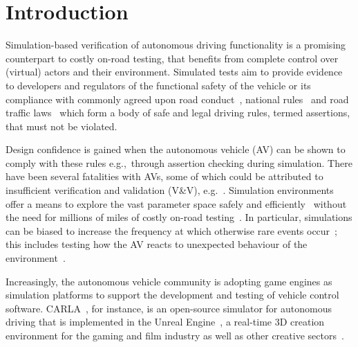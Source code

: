 \section{Introduction} \label{s:introduction}
Simulation-based verification of autonomous driving functionality is a promising counterpart to costly on-road testing, that benefits from complete control over (virtual) actors and their environment.
%
Simulated tests aim to provide evidence to developers and regulators of the functional safety of the vehicle or its compliance with commonly agreed upon road conduct~\cite{ViennaConv}, national rules~\cite{codes2015highway} and road traffic laws~\cite{RoadTraffic1988} which form a body of safe and legal driving rules, termed assertions, that must not be violated. 

Design confidence is gained when the autonomous vehicle (AV) can be shown to comply with these rules e.g.,\ through assertion checking during simulation. There have been several fatalities with AVs, some of which could be attributed to insufficient verification and validation (V\&V), e.g.~\cite{FatalityExample}. Simulation environments offer a means to explore the vast parameter space safely and efficiently~\cite{korosec2019waymo} without the need for millions of miles of costly on-road testing~\cite{kalra2016driving}. In particular, simulations can be biased to increase the frequency at which otherwise rare events occur~\cite{Koopman2018}; this includes testing how the AV reacts to unexpected behaviour of the environment~\cite{RobustnessAutonomy}. 

Increasingly, the autonomous vehicle community is adopting game engines as simulation platforms to support the development and testing of vehicle control software. 
%
CARLA~\cite{carla_main_website}, for instance, is an open-source simulator for autonomous driving that is implemented in the Unreal Engine~\cite{UE4_main_website}, a real-time 3D creation environment for the gaming and film industry as well as other creative sectors~\cite{CARLA_paper}. 

